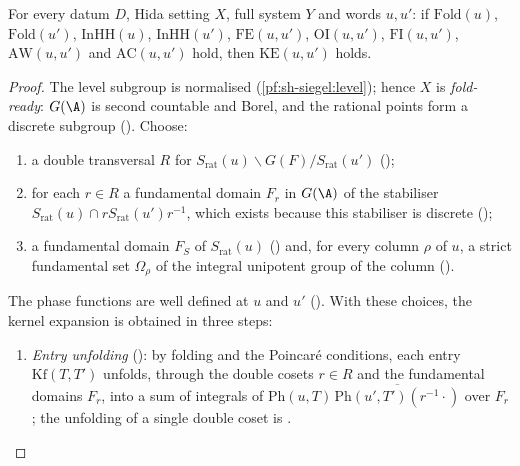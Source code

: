 \begin{theorem}\label{pf:sh-siegel:kexp}
For every datum $D$, Hida setting $X$, full system $Y$ and words $u,u'$: if $\mathrm{Fold}(u)$, $\mathrm{Fold}(u')$,
$\mathrm{InHH}(u)$, $\mathrm{InHH}(u')$, $\mathrm{FE}(u,u')$, $\mathrm{OI}(u,u')$, $\mathrm{FI}(u,u')$, $\mathrm{AW}(u,u')$ and
$\mathrm{AC}(u,u')$ hold, then $\mathrm{KE}(u,u')$ holds.
\end{theorem}

\begin{proof}
The level subgroup is normalised (\cref{pf:sh-siegel:level}); hence $X$ is \emph{fold-ready}: $G(\A)$ is second countable
and Borel, and the rational points form a discrete subgroup ().
Choose:
\begin{enumerate}[label=(\arabic*)]
\item a double transversal $R$ for $S_{\mathrm{rat}}(u)\backslash G(F)/S_{\mathrm{rat}}(u')$
();
\item for each $r\in R$ a fundamental domain $F_r$ in $G(\A)$ of the stabiliser $S_{\mathrm{rat}}(u)\cap
rS_{\mathrm{rat}}(u')r^{-1}$, which exists because this stabiliser is discrete
();
\item a fundamental domain $F_S$ of $S_{\mathrm{rat}}(u)$ () and, for
every column $\rho$ of $u$, a strict fundamental set $\Omega_\rho$ of the integral unipotent group of the column
().
\end{enumerate}
The phase functions are well defined at $u$ and $u'$ (). With these choices,
the kernel expansion is obtained in three steps:
\begin{enumerate}[label=(\roman*)]
\item \emph{Entry unfolding} (): by folding and the Poincar\'e
conditions, each entry $\mathrm{Kf}(T,T')$ unfolds, through the double cosets $r\in R$ and the fundamental domains $F_r$, into
a sum of integrals of $\mathrm{Ph}(u,T)\,\overline{\mathrm{Ph}(u',T')(r^{-1}\cdot)}$ over $F_r$; the unfolding of a single
double coset is .

\end{enumerate}
\end{proof}
